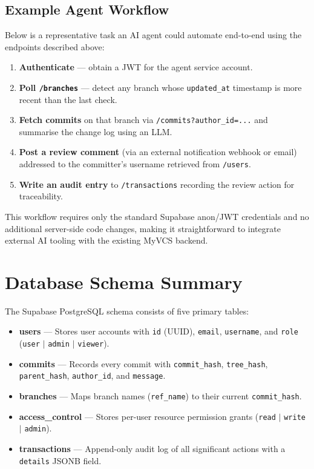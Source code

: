 \documentclass{article}
\begin{document}
\subsection{Example Agent Workflow}

Below is a representative task an AI agent could automate end-to-end
using the endpoints described above:

\begin{enumerate}
    \item \textbf{Authenticate} --- obtain a JWT for the agent service
          account.
    \item \textbf{Poll \texttt{/branches}} --- detect any branch whose
          \texttt{updated\_at} timestamp is more recent than the last
          check.
    \item \textbf{Fetch commits} on that branch via
          \texttt{/commits?author\_id=...} and summarise the change log
          using an LLM.
    \item \textbf{Post a review comment} (via an external notification
          webhook or email) addressed to the committer's username
          retrieved from \texttt{/users}.
    \item \textbf{Write an audit entry} to \texttt{/transactions}
          recording the review action for traceability.
\end{enumerate}

This workflow requires only the standard Supabase anon/JWT credentials and
no additional server-side code changes, making it straightforward to
integrate external AI tooling with the existing MyVCS backend.

\section{Database Schema Summary}

The Supabase PostgreSQL schema consists of five primary tables:

\begin{itemize}
    \item \textbf{users} --- Stores user accounts with
          \texttt{id} (UUID), \texttt{email}, \texttt{username}, and
          \texttt{role} (\texttt{user} $|$ \texttt{admin} $|$
          \texttt{viewer}).
    \item \textbf{commits} --- Records every commit with
          \texttt{commit\_hash}, \texttt{tree\_hash},
          \texttt{parent\_hash}, \texttt{author\_id}, and
          \texttt{message}.
    \item \textbf{branches} --- Maps branch names (\texttt{ref\_name})
          to their current \texttt{commit\_hash}.
    \item \textbf{access\_control} --- Stores per-user resource
          permission grants (\texttt{read} $|$ \texttt{write} $|$
          \texttt{admin}).
    \item \textbf{transactions} --- Append-only audit log of all
          significant actions with a \texttt{details} JSONB field.
\end{itemize}
\end{document}
